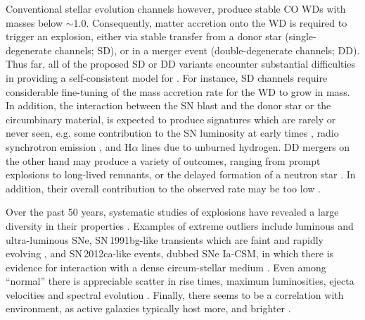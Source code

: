 \documentclass[twocolumn,tighten,times]{aastex62}
\begin{document}
Conventional stellar evolution channels however, produce stable CO WDs with masses below $\sim 1.0$\msun. 
Consequently, matter accretion onto the WD is required to trigger an 
explosion, either via stable  transfer from a 
donor star (single-degenerate channels; SD), or in a 
merger event (double-degenerate channels; DD).  
Thus far, all of the proposed SD or DD variants    
encounter substantial difficulties in providing 
a self-consistent model for \ias \citep{Livio:2018rue}. 
For instance, SD channels require considerable fine-tuning
of the mass accretion rate for
the WD to grow in mass. In addition, the interaction between  
the SN blast and the donor star or the circumbinary material, is expected to produce  signatures which 
are rarely or never seen, e.g. some contribution to the SN  luminosity 
at early times \citep{Kasen:2009si}, radio synchrotron emission 
\citep{Harris:2016hfr}, and H$\alpha$ lines due to unburned hydrogen. 
DD mergers on the other hand may produce a variety of outcomes, 
ranging from prompt 
explosions to long-lived remnants, or the delayed formation of a neutron star \citep{Livio:2018rue}. In addition, their overall contribution to the observed \ia rate may be too low \citep{vanKerkwijk:2010he,claeys2014a,Sato:2015spa}. %


Over the past 50 years, systematic studies of \ia explosions have revealed a large
diversity in their properties \citep{Taubenberger:2017hoo}. 
Examples of extreme outliers include luminous 
\citep[e.g. SN\,1991T;][]{filippenko1992} and ultra-luminous  
\citep[e.g. SNLS-03D3bb;][]{Howell:2006vn} SNe, SN\,1991bg-like transients which
are faint and rapidly evolving \citep{ruiz-lapuente1993},  
and SN\,2012ca-like events, dubbed SNe Ia-CSM, in which 
there is evidence for interaction with a dense circum-stellar 
medium \citep{Bochenek:2017vok}. 
Even among ``normal'' \ias there is appreciable
scatter in rise times, maximum luminosities, ejecta velocities and spectral evolution   
\citep[][]{Livio:2018rue}. 
Finally, there seems to be a correlation with environment, 
as active  galaxies typically  host more, and brighter \ias \citep{Pritchet:2008np}. 
\end{document}

